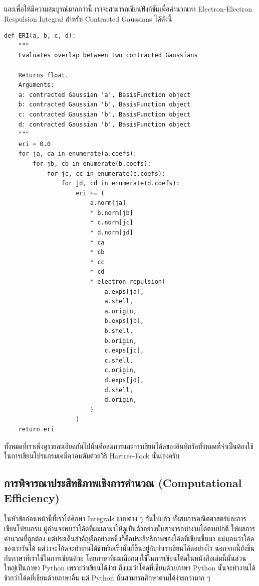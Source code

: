 \noindent และเพื่อให้มีความสมบูรณ์มากกว่านี้ เราจะสามารถเขียนฟังก์ชันเพื่อคำนวณหา Electron-Electron Respulsion Integral สำหรับ Contracted Gaussians ได้ดังนี้

\vspace{5pt}

\begin{lstlisting}[style=MyPython]
def ERI(a, b, c, d):
    """
    Evaluates overlap between two contracted Gaussians

    Returns float.
    Arguments:
    a: contracted Gaussian 'a', BasisFunction object
    b: contracted Gaussian 'b', BasisFunction object
    c: contracted Gaussian 'b', BasisFunction object
    d: contracted Gaussian 'b', BasisFunction object
    """
    eri = 0.0
    for ja, ca in enumerate(a.coefs):
        for jb, cb in enumerate(b.coefs):
            for jc, cc in enumerate(c.coefs):
                for jd, cd in enumerate(d.coefs):
                    eri += (
                        a.norm[ja]
                        * b.norm[jb]
                        * c.norm[jc]
                        * d.norm[jd]
                        * ca
                        * cb
                        * cc
                        * cd
                        * electron_repulsion(
                            a.exps[ja],
                            a.shell,
                            a.origin,
                            b.exps[jb],
                            b.shell,
                            b.origin,
                            c.exps[jc],
                            c.shell,
                            c.origin,
                            d.exps[jd],
                            d.shell,
                            d.origin,
                        )
                    )
    return eri
\end{lstlisting}

\vspace{5pt}

ทั้งหมดที่เราเพิ่งดูรายละเอียดกันไปนั้นคือสมการและการเขียนโค้ดของอินทิกรัลทั้งหมดที่จำเป็นต้องใช้ในการเขียนโปรแกรมเคมีควอนตัมด้วยวิธี Hartree-Fock นั่นเองครับ

\subsection{การพิจารณาประสิทธิภาพเชิงการคำนวณ (Computational Efficiency)}

ในหัวข้อก่อนหน้านี้ที่เราได้ศึกษา Integrals แบบต่าง ๆ กันไปแล้ว ทั้งสมการคณิตศาสตร์และการเขียนโปรแกรม ผู้อ่านจะพบว่าโค้ดที่ผมเอามาให้ดูเป็นตัวอย่างนั้นสามารถทำงานได้ตามปกติ ให้ผลการคำนวณที่ถูกต้อง แต่ประเด็นสำคัญอีกอย่างหนึ่งก็คือประสิทธิภาพของโค้ดที่เขียนขึ้นมา แน่นอนว่าโค้ดของเรารันได้ แต่ว่าจะโค้ดจะทำงานได้ช้าหรือเร็วนั้นก็ขึ้นอยู่กับว่าเราเขียนโค้ดอย่างไร นอกจากนี้ยังขึ้นกับภาษาที่เราใช้ในการเขียนด้วย โดยภาษาที่ผมเลือกมาใช้ในการเขียนโค้ดในหนังสือเล่มนี้นั้นส่วนใหญ่เป็นภาษา Python เพราะว่าเขียนได้ง่าย ถึงแม้ว่าโค้ดที่เขียนด้วยภาษา Python นั้นจะทำงานได้ช้ากว่าโค้ดที่เขียนด้วยภาษาอื่น แต่ Python นั้นสามารถศึกษาตามได้ง่ายกว่ามาก ๆ

